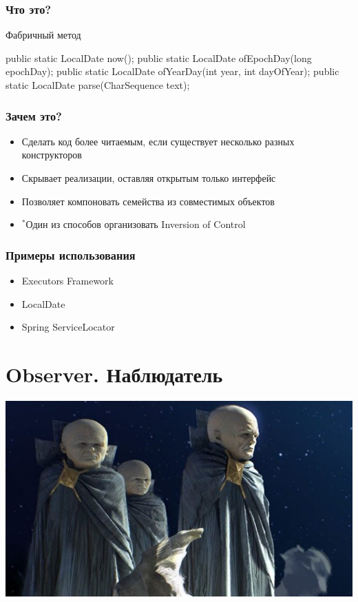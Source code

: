 \documentclass[russian,aspectratio=169,14pt]{beamer}
\begin{document}
\begin{frame}[fragile]
	\frametitle{Что это?}
	Фабричный метод
	\begin{listjava}
public static LocalDate now();
public static LocalDate ofEpochDay(long epochDay);
public static LocalDate ofYearDay(int year, int dayOfYear);
public static LocalDate parse(CharSequence text);
	\end{listjava}
\end{frame}

\begin{frame}
	\frametitle{Зачем это?}
	\begin{itemize}
		\item Сделать код более читаемым, если существует несколько разных конструкторов
		\pause
		\item Скрывает реализации, оставляя открытым только интерфейс
		\pause
		\item Позволяет компоновать семейства из совместимых объектов
		\pause
		\item $^*$Один из способов организовать Inversion of Control
	\end{itemize}
\end{frame}

\begin{frame}
	\frametitle{Примеры использования}
	\begin{itemize}
		\item Executors Framework
		\item LocalDate
		\item Spring ServiceLocator
	\end{itemize}
\end{frame}




\section{Observer. Наблюдатель}

\begin{frame}
    \begin{center}
	\includegraphics[height=0.8\textheight]{observer.jpg}
	\end{center}
\end{frame}
\end{document}
